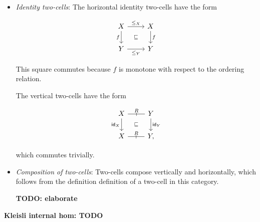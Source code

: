 \begin{itemize}
    \item \emph{Identity two-cells}:
    The horizontal identity two-cells have the form

    \[\begin{tikzcd}[ampersand replacement=\&]
        X \& X \\
        Y \& Y
        \arrow[""{name=0, anchor=center, inner sep=0}, "f"', from=1-1, to=2-1]
        \arrow[""{name=1, anchor=center, inner sep=0}, "f", from=1-2, to=2-2]
        \arrow["{\le_X}", from=1-1, to=1-2]
        \arrow["{\le_Y}"', from=2-1, to=2-2]
        \arrow["\ltdyn"{description}, draw=none, from=0, to=1]
    \end{tikzcd}\]

    This square commutes because $f$ is monotone with respect to the ordering relation.

    The vertical two-cells have the form

    \[\begin{tikzcd}[ampersand replacement=\&]
        X \& Y \\
        X \& Y
        \arrow["R", "\shortmid"{marking}, no head, from=1-1, to=1-2]
        \arrow["R", "\shortmid"{marking}, no head, from=2-1, to=2-2]
        \arrow[""{name=0, anchor=center, inner sep=0}, "{\id_X}"', from=1-1, to=2-1]
        \arrow[""{name=1, anchor=center, inner sep=0}, "{\id_Y}", from=1-2, to=2-2]
        \arrow["\ltdyn"{description}, draw=none, from=0, to=1],
    \end{tikzcd}\]

    which commutes trivially.

    \item \emph{Composition of two-cells}:
    Two-cells compose vertically and horizontally, which follows from the definition
    definition of a two-cell in this category.

    \textbf{TODO: elaborate}
\end{itemize}

\vspace{3ex}

\textbf{Kleisli internal hom: TODO}

